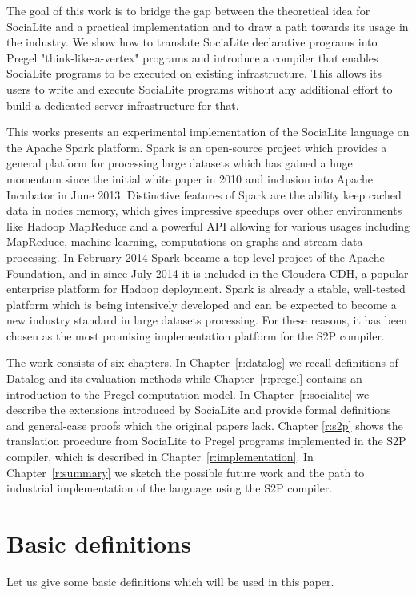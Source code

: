 \documentclass{pracamgr}
\theoremstyle{plain}
\theoremstyle{definition}
\theoremstyle{remark}
\begin{document}
The goal of this work is to bridge the gap between the theoretical idea for SociaLite and a practical implementation and to draw a path towards its usage in the industry. We show how to translate SociaLite declarative programs into Pregel "think-like-a-vertex" programs and introduce a compiler that enables SociaLite programs to be executed on existing infrastructure. This allows its users to write and execute SociaLite programs without any additional effort to build a dedicated server infrastructure for that.

This works presents an experimental implementation of the SociaLite language on the Apache Spark platform. Spark \cite{spark2} is an open-source project which provides a general platform for processing large datasets which has gained a huge momentum since the initial white paper in 2010 \cite{spark} and inclusion into Apache Incubator in June 2013. Distinctive features of Spark are the ability keep cached data in nodes memory, which gives impressive speedups over other environments like Hadoop MapReduce and a powerful API allowing for various usages including MapReduce, machine learning, computations on graphs and stream data processing. In February 2014 Spark became a top-level project of the Apache Foundation, and in since July 2014 it is included in the Cloudera CDH, a popular enterprise platform for Hadoop deployment. Spark is already a stable, well-tested platform which is being intensively developed and can be expected to become a new industry standard in large datasets processing. For these reasons, it has been chosen as the most promising implementation platform for the S2P compiler.

The work consists of six chapters. In Chapter~\ref{r:datalog} we recall definitions of Datalog and its evaluation methods while Chapter~\ref{r:pregel} contains an introduction to the Pregel computation model. In Chapter~\ref{r:socialite} we describe the extensions introduced by SociaLite and provide formal definitions and general-case proofs which the original papers lack. Chapter \ref{r:s2p} shows the translation procedure from SociaLite to Pregel programs implemented in the S2P compiler, which is described in Chapter~\ref{r:implementation}. In Chapter~\ref{r:summary} we sketch the possible future work and the path to industrial implementation of the language using the S2P compiler.

\section{Basic definitions}\label{r:basicdefs}
Let us give some basic definitions which will be used in this paper.
\end{document}
